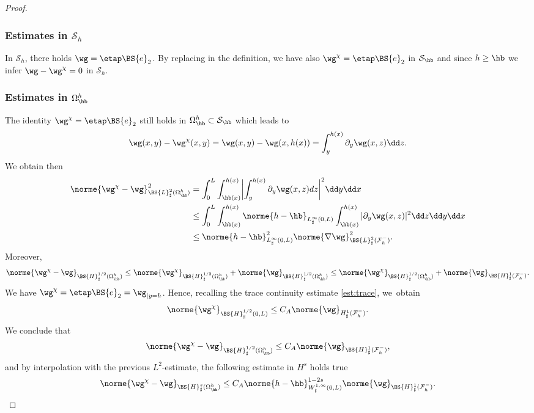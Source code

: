 \begin{proof}
\subsubsection*{Estimates in $\mathcal{S}_{h}$}
In $\mathcal{S}_{h}$, there holds $\wg=\etap \BS{e}_2$. By replacing in the definition, we have also $\wg^\chi = \etap\BS{e}_2$ in $\mathcal{S}_{\hb}$ and since $h\geq \hb$ we infer $\wg - \wg^{\chi} = 0$ in $\mathcal{S}_{h}$.

\subsubsection*{Estimates in $\Omega^{h}_{\hb}$}
The identity $\wg^\chi=\etap\BS{e}_{2}$ still holds in $\Omega^{h}_{\hb} \subset \mathcal S_{\hb}$ which leads to
\[\wg(x,y)- \wg^{\chi}(x,y) = \wg(x,y) - \wg(x,h(x)) =\int_{y}^{h(x)}\partial_y\wg(x,z)\dd z.\]
We obtain then
\[
\begin{aligned}
\norme{\wg^\chi - \wg}_{\BS{L}^{2}_{\sharp}(\Omega_{\hb}^{h})}^{2}&{}=\int_{0}^{L}\int_{\hb(x)}^{h(x)}\biggl\vert \int_{y}^{h(x)}\partial_y\wg(x,z)dz\biggl\vert^{2}\dd y\dd x\\
&\leq \int_{0}^{L}\int_{\hb(x)}^{h(x)}\norme{h-\hb}_{L^{\infty}_{\sharp}(0,L)}\int_{\hb(x)}^{h(x)}\vert\partial_y\wg(x,z)\vert^{2}\dd z\dd y\dd x\\
&\leq \norme{h-\hb}_{L^{\infty}_{\sharp}(0,L)}^{2}\norme{\nabla\wg}_{\BS{L}^{2}_{\sharp}(\mathcal{F}^{-}_{h})}^{2}.
\end{aligned}
\]
Moreover,
\[\norme{\wg^\chi-\wg}_{\BS{H}^{1/2}_{\sharp}(\Omega_{\hb}^{h})}\leq \norme{\wg^\chi}_{\BS{H}^{1/2}_{\sharp}(\Omega_{\hb}^{h})} + \norme{\wg}_{\BS{H}^{1/2}_{\sharp}(\Omega_{\hb}^{h})}\leq \norme{\wg^\chi}_{\BS{H}^{1/2}_{\sharp}(\Omega_{\hb}^{h})} + \norme{\wg}_{\BS{H}^{1}_{\sharp}(\mathcal{F}^{-}_{h})}.
\]
We have
$\wg^\chi=\etap\BS{e}_2=\wg_{|{y=h}}$. Hence,
recalling the trace continuity estimate \eqref{est:trace}, we~obtain
\[
\norme{\wg^\chi}_{\BS{H}^{1/2}_{\sharp}(0,L)} \leq C_A\norme{\wg}_{H^{1}_{\sharp}(\mathcal{F}^{-}_{h})}.
\]
We conclude that
\[\norme{\wg^\chi-\wg}_{\BS{H}^{1/2}_{\sharp}(\Omega_{\hb}^{h})}\leq C_A\norme{\wg}_{\BS{H}^{1}_{\sharp}(\mathcal{F}^{-}_{h})},\]
and by interpolation with the previous $L^2$-estimate, the following estimate in $H^s$ holds true
\begin{equation} \label{eq_enhaut}
\norme{\wg^\chi-\wg}_{\BS{H}^{s}_{\sharp}(\Omega^{h}_{\hb})}\leq C_A\norme{h-\hb}_{W^{1,\infty}_{\sharp}(0,L)}^{1-2s}\norme{\wg}_{\BS{H}^{1}_{\sharp}(\mathcal{F}^{-}_{h})}.
\end{equation}


\end{proof}
